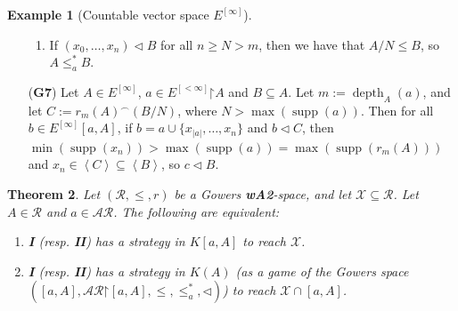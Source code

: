 \documentclass[11pt,reqno]{amsart}
\theoremstyle{plain}
\numberwithin{equation}{section}
\newtheorem{theorem}{Theorem}[section]
\theoremstyle{definition}
\newtheorem{example}[theorem]{Example}
\newcommand{\func}{\operatorname}
\renewcommand{\c}[1]{\left\langle #1 \right\rangle}
\newcommand{\cal}{\mathcal}
\newcommand{\supp}{\func{supp}}
\newcommand{\restrictedto}{\mathord{\upharpoonright}}
\newcommand{\X}{\cal{X}}
\newcommand{\depth}{\func{depth}}
\begin{document}
\begin{example}[Countable vector space $E^{[\infty]}$]
\begin{enumerate}
\begin{enumerate}[label=(\arabic*)]
            \item If $(x_0,\dots,x_n) \lhd B$ for all $n \geq N > m$, then we have that $A/N \leq B$, so $A \leq_a^* B$.
        \end{enumerate}

        \item[(\textbf{G7})] Let $A \in E^{[\infty]}$, $a \in E^{[<\infty]}\restrictedto A$ and $B \subseteq A$. Let $m := \depth_A(a)$, and let $C := r_m(A)^\frown(B/N)$, where $N > \max(\supp(a))$. Then for all $b \in E^{[\infty]}[a,A]$, if $b = a \cup \{x_{|a|},\dots,x_n\}$ and $b \lhd C$, then $\min(\supp(x_n)) > \max(\supp(a)) = \max(\supp(r_m(A)))$ and $x_n \in \c{C} \subseteq \c{B}$, so $c \lhd B$.
    \end{enumerate}
\end{example}


\begin{theorem}
\label{thm:kr.strategies.equivalence}
    Let $(\cal{R},\leq,r)$ be a Gowers \textbf{wA2}-space, and let $\X \subseteq \cal{R}$. Let $A \in \cal{R}$ and $a \in \cal{AR}$. The following are equivalent:
    \begin{enumerate}
        \item \textbf{I} (resp. \textbf{II}) has a strategy in $K[a,A]$ to reach $\X$.

        \item \textbf{I} (resp. \textbf{II}) has a strategy in $K(A)$ (as a game of the Gowers space $([a,A],\cal{AR}\restrictedto[a,A],\leq,\leq_a^*,\lhd)$) to reach $\X \cap [a,A]$.
    \end{enumerate}
\end{theorem}
\end{document}
